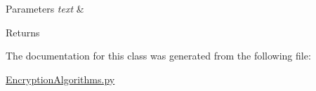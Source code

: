 \begin{DoxyParams}{Parameters}
{\em text} & \\
\hline
\end{DoxyParams}
\begin{DoxyReturn}{Returns}

\end{DoxyReturn}


The documentation for this class was generated from the following file\+:\begin{DoxyCompactItemize}
\item 
\mbox{\hyperlink{EncryptionAlgorithms_8py}{Encryption\+Algorithms.\+py}}\end{DoxyCompactItemize}
